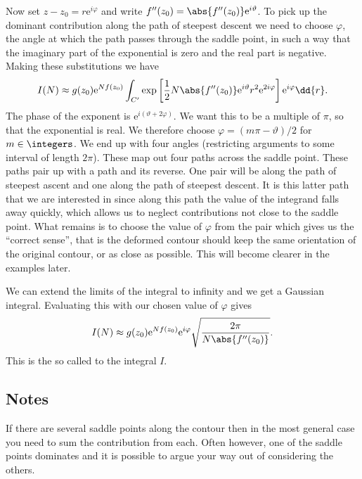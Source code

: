 \documentclass[fleqn]{NotesClass}
\newcommand*{\e}{\mathrm{e}}
\begin{document}
    Now set \(z - z_0 = r\e^{i\varphi}\) and write \(f''(z_0) = \abs{f''(z_0)}\e^{i\vartheta}\).
    To pick up the dominant contribution along the path of steepest descent we need to choose \(\varphi\), the angle at which the path passes through the saddle point, in such a way that the imaginary part of the exponential is zero and the real part is negative.
    Making these substitutions we have
    \begin{equation}
        I(N) \approx g(z_0) \e^{Nf(z_0)} \int_{C'} \exp\left[ \frac{1}{2}N\abs{f''(z_0)}\e^{i\vartheta}r^2\e^{2i\varphi} \right] \e^{i\varphi}\dd{r}.
    \end{equation}
    The phase of the exponent is \(\e^{i(\vartheta + 2\varphi)}\).
    We want this to be a multiple of \(\pi\), so that the exponential is real.
    We therefore choose \(\varphi = (m\pi - \vartheta)/2\) for \(m\in\integers\).
    We end up with four angles (restricting arguments to some interval of length \(2\pi\)).
    These map out four paths across the saddle point.
    These paths pair up with a path and its reverse.
    One pair will be along the path of steepest ascent and one along the path of steepest descent.
    It is this latter path that we are interested in since along this path the value of the integrand falls away quickly, which allows us to neglect contributions not close to the saddle point.
    What remains is to choose the value of \(\varphi\) from the pair which gives us the \enquote{correct sense}, that is the deformed contour should keep the same orientation of the original contour, or as close as possible.
    This will become clearer in the examples later.
    
    We can extend the limits of the integral to infinity and we get a Gaussian integral.
    Evaluating this with our chosen value of \(\varphi\) gives
    \begin{equation}
        I(N) \approx g(z_0) \e^{Nf(z_0)} \e^{i\varphi} \sqrt{\frac{2\pi}{N\abs{f''(z_0)}}}.
    \end{equation}
    This is the so called  to the integral \(I\).
    
    \subsection{Notes}
    If there are several saddle points along the contour then in the most general case you need to sum the contribution from each.
    Often however, one of the saddle points dominates and it is possible to argue your way out of considering the others.
    
\end{document}
